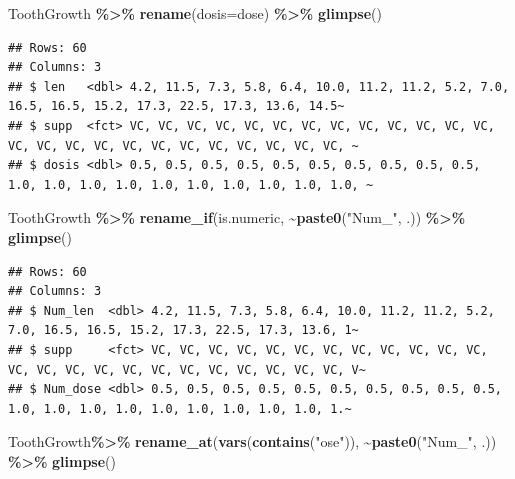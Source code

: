 \documentclass[
]{book}
\newenvironment{Shaded}{\begin{snugshade}}{\end{snugshade}}
\newcommand{\AttributeTok}[1]{\textcolor[rgb]{0.13,0.29,0.53}{#1}}
\newcommand{\FunctionTok}[1]{\textcolor[rgb]{0.13,0.29,0.53}{\textbf{#1}}}
\newcommand{\NormalTok}[1]{#1}
\newcommand{\SpecialCharTok}[1]{\textcolor[rgb]{0.81,0.36,0.00}{\textbf{#1}}}
\newcommand{\StringTok}[1]{\textcolor[rgb]{0.31,0.60,0.02}{#1}}
\begin{document}
\begin{Shaded}
\begin{Highlighting}[]
\NormalTok{ToothGrowth }\SpecialCharTok{\%\textgreater{}\%} \FunctionTok{rename}\NormalTok{(}\AttributeTok{dosis=}\NormalTok{dose) }\SpecialCharTok{\%\textgreater{}\%} \FunctionTok{glimpse}\NormalTok{()}
\end{Highlighting}
\end{Shaded}

\begin{verbatim}
## Rows: 60
## Columns: 3
## $ len   <dbl> 4.2, 11.5, 7.3, 5.8, 6.4, 10.0, 11.2, 11.2, 5.2, 7.0, 16.5, 16.5, 15.2, 17.3, 22.5, 17.3, 13.6, 14.5~
## $ supp  <fct> VC, VC, VC, VC, VC, VC, VC, VC, VC, VC, VC, VC, VC, VC, VC, VC, VC, VC, VC, VC, VC, VC, VC, VC, VC, ~
## $ dosis <dbl> 0.5, 0.5, 0.5, 0.5, 0.5, 0.5, 0.5, 0.5, 0.5, 0.5, 1.0, 1.0, 1.0, 1.0, 1.0, 1.0, 1.0, 1.0, 1.0, 1.0, ~
\end{verbatim}

\begin{Shaded}
\begin{Highlighting}[]
\NormalTok{ToothGrowth }\SpecialCharTok{\%\textgreater{}\%} \FunctionTok{rename\_if}\NormalTok{(is.numeric, }\SpecialCharTok{\textasciitilde{}}\FunctionTok{paste0}\NormalTok{(}\StringTok{"Num\_"}\NormalTok{, .)) }\SpecialCharTok{\%\textgreater{}\%} \FunctionTok{glimpse}\NormalTok{()}
\end{Highlighting}
\end{Shaded}

\begin{verbatim}
## Rows: 60
## Columns: 3
## $ Num_len  <dbl> 4.2, 11.5, 7.3, 5.8, 6.4, 10.0, 11.2, 11.2, 5.2, 7.0, 16.5, 16.5, 15.2, 17.3, 22.5, 17.3, 13.6, 1~
## $ supp     <fct> VC, VC, VC, VC, VC, VC, VC, VC, VC, VC, VC, VC, VC, VC, VC, VC, VC, VC, VC, VC, VC, VC, VC, VC, V~
## $ Num_dose <dbl> 0.5, 0.5, 0.5, 0.5, 0.5, 0.5, 0.5, 0.5, 0.5, 0.5, 1.0, 1.0, 1.0, 1.0, 1.0, 1.0, 1.0, 1.0, 1.0, 1.~
\end{verbatim}

\begin{Shaded}
\begin{Highlighting}[]
\NormalTok{ToothGrowth}\SpecialCharTok{\%\textgreater{}\%} \FunctionTok{rename\_at}\NormalTok{(}\FunctionTok{vars}\NormalTok{(}\FunctionTok{contains}\NormalTok{(}\StringTok{"ose"}\NormalTok{)), }\SpecialCharTok{\textasciitilde{}}\FunctionTok{paste0}\NormalTok{(}\StringTok{"Num\_"}\NormalTok{, .)) }\SpecialCharTok{\%\textgreater{}\%} \FunctionTok{glimpse}\NormalTok{()}
\end{Highlighting}
\end{Shaded}
\end{document}

